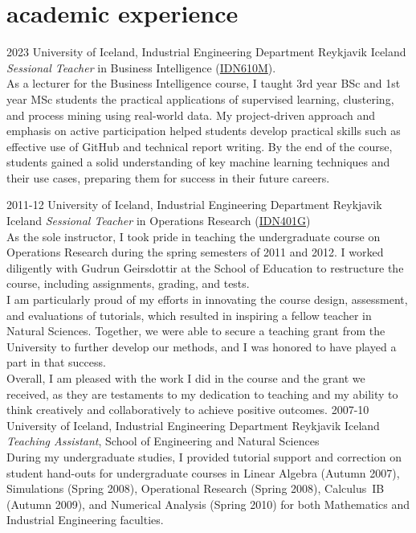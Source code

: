 \section{academic experience}
\begin{entrylist}
\entry
{2023}
{University of Iceland, Industrial Engineering Department}
{Reykjavik Iceland}
{\emph{Sessional Teacher} in Business Intelligence (\href{https://ugla.hi.is/kennsluskra/index.php?tab=nam&chapter=namskeid&id=71001420230}{IDN610M}). \\
As a lecturer for the Business Intelligence course, I taught 3rd year BSc and 1st year MSc students the practical applications of supervised learning, clustering, and process mining using real-world data. My project-driven approach and emphasis on active participation helped students develop practical skills such as effective use of GitHub and technical report writing. By the end of the course, students gained a solid understanding of key machine learning techniques and their use cases, preparing them for success in their future careers.
}
\end{entrylist}
\begin{entrylist}
\entry
{2011-12}
{University of Iceland, Industrial Engineering Department}
{Reykjavik Iceland}
{\emph{Sessional Teacher} in Operations Research (\href{https://ugla.hi.is/kennsluskra/index.php?sid=&tab=nam&chapter=namskeid&id=08213020110}{IDN401G})\\
As the sole instructor, I took pride in teaching the undergraduate course on Operations Research during the spring semesters of 2011 and 2012. I worked diligently with Gudrun Geirsdottir at the School of Education to restructure the course, including assignments, grading, and tests.\\
I am particularly proud of my efforts in innovating the course design, assessment, and evaluations of tutorials, which resulted in inspiring a fellow teacher in Natural Sciences. Together, we were able to secure a teaching grant from the University to further develop our methods, and I was honored to have played a part in that success.\\
Overall, I am pleased with the work I did in the course and the grant we received, as they are testaments to my dedication to teaching and my ability to think creatively and collaboratively to achieve positive outcomes.
}	
\entry
{2007-10}
{University of Iceland, Industrial Engineering Department}
{Reykjavik Iceland}
{\emph{Teaching Assistant}, School of Engineering and Natural Sciences \\
During my undergraduate studies, I provided tutorial support and correction on student hand-outs for undergraduate courses in Linear Algebra (Autumn 2007), Simulations (Spring 2008), Operational Research (Spring 2008), Calculus~IB (Autumn 2009), and Numerical Analysis (Spring 2010) for both Mathematics and Industrial Engineering faculties.}
\end{entrylist}   
